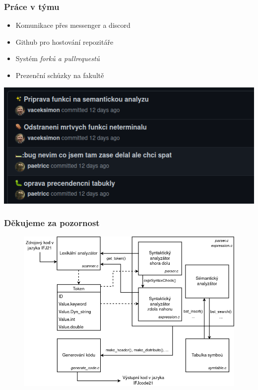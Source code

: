 \begin{frame}
  \frametitle{Práce v týmu}
  \begin{itemize}
    \setlength\itemsep{1em}
        \item Komunikace přes messenger a discord
        \item Github pro hostování repozitáře
        \item Systém \emph{forků a pullrequestů}
        \item Prezenční schůzky na fakultě
    \end{itemize}
    
  \vspace{1em}
    
  \centering
  \includegraphics[scale=0.4,keepaspectratio]{img/commit_kekw.png}
\end{frame}


\appendix{}
\begin{frame}
  \frametitle{Děkujeme za pozornost}
    \begin{figure}[htbp]
        \centering
        \includegraphics[width=\textwidth,height=\textheight,keepaspectratio]{img/DiagramFinal2.png}
        \label{fig:my_label}
    \end{figure}
 
\end{frame}




